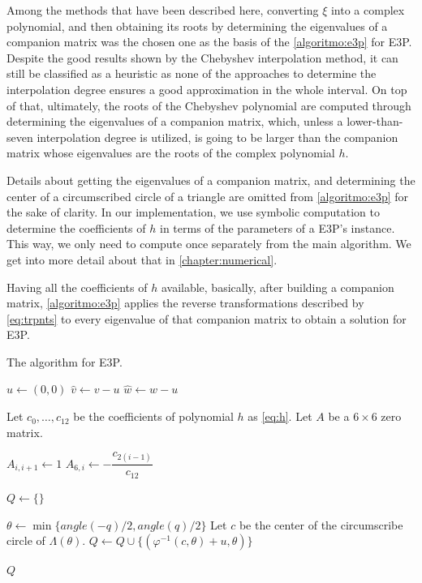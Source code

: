 Among the methods that have been described here, converting $\xi$ into a complex polynomial, and then obtaining its roots by determining the eigenvalues of a companion matrix was the chosen one as the basis of the \autoref{algoritmo:e3p} for E3P.
Despite the good results shown by the Chebyshev interpolation method,
it can still be classified as a heuristic as none of the approaches to determine the interpolation degree ensures a good approximation in the whole interval.
On top of that, ultimately, the roots of the Chebyshev polynomial are computed through determining the eigenvalues of a companion matrix, which, unless a lower-than-seven interpolation degree is utilized, is going to be larger than the companion matrix whose eigenvalues are the roots of the complex polynomial $h$.

Details about getting the eigenvalues of a companion matrix, and determining the center of a circumscribed circle of a triangle are omitted from \autoref{algoritmo:e3p} for the sake of clarity. 
In our implementation, we use symbolic computation to determine the coefficients of $h$ in terms of the parameters of a E3P's instance. This way, we only need to compute once separately from the main algorithm. We get into more detail about that in \autoref{chapter:numerical}.

Having all the coefficients of $h$ available, basically, after building a companion matrix, \autoref{algoritmo:e3p} applies the reverse transformations described by \autoref{eq:trpnts} to every eigenvalue of that companion matrix to obtain a solution for E3P.

\begin{algoritmo}
	\caption{The algorithm for E3P.}\label{algoritmo:e3p}
	\begin{algorithmic}[1]
		
		\item[]
		
		
		\State $\hat{u}\gets (0,0)$ 
		\State $\hat{v} \gets v-u$
		\State $\hat{w} \gets w-u$
		
		\State Let $c_0, \dots, c_{12}$ be the coefficients of polynomial $h$ as \autoref{eq:h}.
		\State Let $A$ be a $6\times6$ zero matrix.
		
			\State $A_{i,i+1} \gets 1$
			\State $A_{6,i} \gets -\dfrac{c_{2(i-1)}}{c_{12}}$
		\EndFor

		
		\State $Q \gets \{\}$
		
		 
		\State $\theta\gets \min\{angle(-q)/2, angle(q)/2\}$
			\State Let $c$ be the center of the circumscribe circle of $\Lambda(\theta)$.
			\State $Q \gets Q\cup \{(\varphi^{-1}(c, \theta)+u, \theta)\}$
		\EndIf
		\EndFor
				
		\State \Return $Q$
		\EndProcedure
	\end{algorithmic}
\end{algoritmo}

